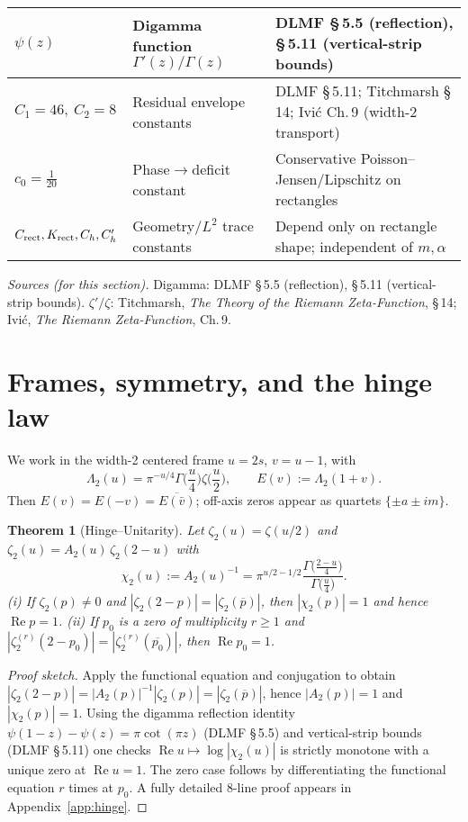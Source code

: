 \documentclass[11pt]{article}
\numberwithin{equation}{section}
\newtheorem{theorem}{Theorem}[section]
\theoremstyle{remark}
\DeclareMathOperator{\Real}{Re}
\newcommand{\LamTwo}{\Lambda_2}
\newcommand{\chiTwo}{\chi_2}
\begin{document}
\begin{tabularx}{\textwidth}{|p{3.0cm}|L|L|}
\hline
$\psi(z)$ & Digamma function $\Gamma'(z)/\Gamma(z)$ & DLMF §\,5.5 (reflection), §\,5.11 (vertical-strip bounds)\\
\hline
$C_1=46,\ C_2=8$ & Residual envelope constants & DLMF §\,5.11; Titchmarsh §\,14; Ivi\'c Ch.\,9 (width-2 transport)\\
\hline
$c_0=\tfrac1{20}$ & Phase$\to$deficit constant & Conservative Poisson--Jensen/Lipschitz on rectangles\\
\hline
$C_{\rm rect},K_{\rm rect},C_h,C_h'$ & Geometry/$L^2$ trace constants & Depend only on rectangle shape; independent of $m,\alpha$\\
\hline
\end{tabularx}
\endgroup

\medskip
\noindent\textit{Sources (for this section).} Digamma: DLMF §\,5.5 (reflection), §\,5.11 (vertical-strip bounds). $\zeta'/\zeta$: Titchmarsh, \textit{The Theory of the Riemann Zeta-Function}, §\,14; Ivi\'c, \textit{The Riemann Zeta-Function}, Ch.\,9.

\section{Frames, symmetry, and the hinge law}\label{sec:frames}

We work in the width-2 centered frame $u=2s$, $v=u-1$, with
\[
\LamTwo(u)=\pi^{-u/4}\Gamma\!\Big(\frac{u}{4}\Big)\zeta\!\Big(\frac{u}{2}\Big),
\qquad
E(v):=\LamTwo(1+v).
\]
Then $E(v)=E(-v)=\overline{E(\bar v)}$; off-axis zeros appear as quartets $\{\pm a\pm im\}$.

\begin{theorem}[Hinge--Unitarity]\label{thm:hinge}
Let $\zeta_2(u)=\zeta(u/2)$ and $\zeta_2(u)=A_2(u)\,\zeta_2(2-u)$ with
\[
\chiTwo(u):=A_2(u)^{-1}=\pi^{u/2-1/2}\frac{\Gamma\big(\frac{2-u}{4}\big)}{\Gamma\big(\frac{u}{4}\big)}.
\]
\emph{(i)} If $\zeta_2(p)\ne 0$ and $|\zeta_2(2-p)|=|\zeta_2(\overline p)|$, then $|\chiTwo(p)|=1$ and hence $\Real p=1$. \;
\emph{(ii)} If $p_0$ is a zero of multiplicity $r\ge1$ and $|\zeta_2^{(r)}(2-p_0)|=|\zeta_2^{(r)}(\overline{p_0})|$, then $\Real p_0=1$.
\end{theorem}

\begin{proof}[Proof sketch]
Apply the functional equation and conjugation to obtain $|\zeta_2(2-p)|=|A_2(p)|^{-1}|\zeta_2(p)|=|\zeta_2(\overline p)|$, hence $|A_2(p)|=1$ and $|\chiTwo(p)|=1$. Using the digamma reflection identity $\psi(1-z)-\psi(z)=\pi\cot(\pi z)$ (DLMF §\,5.5) and vertical-strip bounds (DLMF §\,5.11) one checks $\Real u\mapsto\log|\chiTwo(u)|$ is strictly monotone with a unique zero at $\Real u=1$. The zero case follows by differentiating the functional equation $r$ times at $p_0$. A fully detailed 8-line proof appears in Appendix~\ref{app:hinge}.
\end{proof}
\end{document}
